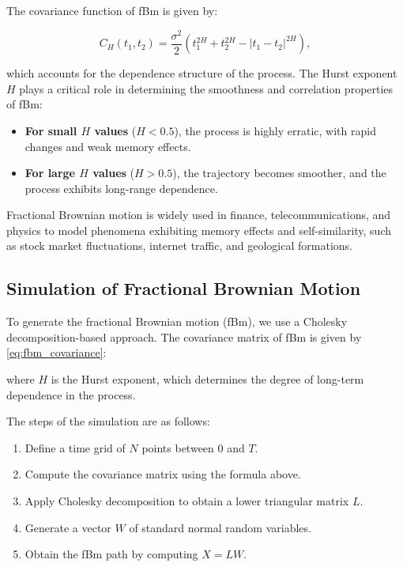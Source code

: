 \documentclass[11pt]{extarticle}
\begin{document}
The covariance function of fBm is given by:

\begin{equation}
    C_H(t_1, t_2) = \frac{\sigma^2}{2} \left( t_1^{2H} + t_2^{2H} - |t_1 - t_2|^{2H} \right),
    \label{eq:fbm_covariance}
\end{equation}

which accounts for the dependence structure of the process. The Hurst exponent \( H \) plays a critical role in determining the smoothness and correlation properties of fBm:

\begin{itemize}
    \item \textbf{For small \( H \) values} (\( H < 0.5 \)), the process is highly erratic, with rapid changes and weak memory effects.
    \item \textbf{For large \( H \) values} (\( H > 0.5 \)), the trajectory becomes smoother, and the process exhibits long-range dependence.
\end{itemize}

Fractional Brownian motion is widely used in finance, telecommunications, and physics to model phenomena exhibiting memory effects and self-similarity, such as stock market fluctuations, internet traffic, and geological formations.


\subsection{Simulation of Fractional Brownian Motion}

To generate the fractional Brownian motion (fBm), we use a Cholesky decomposition-based approach. The covariance matrix of fBm is given by \eqref{eq:fbm_covariance}:

where \( H \) is the Hurst exponent, which determines the degree of long-term dependence in the process.

The steps of the simulation are as follows:
\begin{enumerate}
    \item Define a time grid of \( N \) points between \( 0 \) and \( T \).
    \item Compute the covariance matrix using the formula above.
    \item Apply Cholesky decomposition to obtain a lower triangular matrix \( L \).
    \item Generate a vector \( W \) of standard normal random variables.
    \item Obtain the fBm path by computing \( X = L W \).
\end{enumerate}
\end{document}
